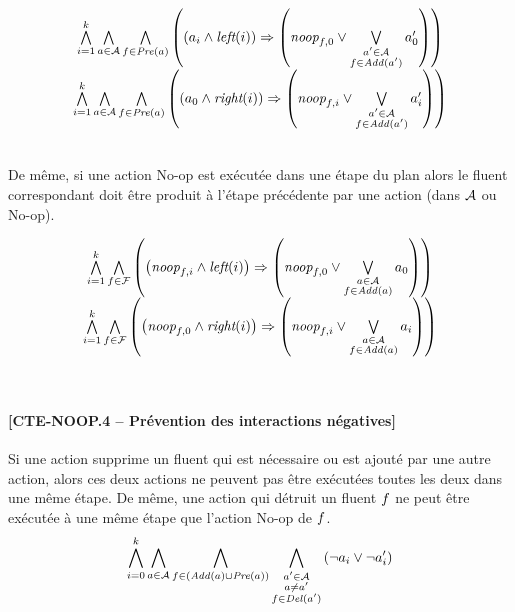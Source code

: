 \begin{small}
\[
\begin{matrix}
\bigwedge\limits_{\substack{i=1}}^{k} \bigwedge\limits_{\substack{a\in\mathcal{A}}} \bigwedge\limits_{\substack{f\in \mathit{Pre}(a)}} \left(\left(a_{i} \wedge \textit{left}(i) \right) \Rightarrow \left(\textit{noop}_{f,0} \vee \bigvee\limits_{\substack{a' \in \mathcal{A} \\ f \in \mathit{Add}(a')}} a'_{0}\right)\right)\\
\bigwedge\limits_{\substack{i=1}}^{k} \bigwedge\limits_{\substack{a\in\mathcal{A}}} \bigwedge\limits_{\substack{f\in \mathit{Pre}(a)}}\left(\left(a_{0} \wedge \textit{right}(i) \right) \Rightarrow \left(\textit{noop}_{f,i} \vee \bigvee\limits_{\substack{a' \in \mathcal{A} \\ f \in \mathit{Add}(a')}} a'_{i}\right)\right)
\end{matrix}
\]
\end{small}\\

De même, si une action No-op est exécutée dans une étape du plan alors le fluent correspondant doit être produit à l'étape précédente par une action (dans $\mathcal{A}$ ou No-op).

\begin{small}
\[
\begin{matrix}
\bigwedge\limits_{\substack{i=1}}^{k} \bigwedge\limits_{\substack{f\in \mathcal{F}}} \left(\left(\textit{noop}_{f,i} \wedge \textit{left}(i) \right) \Rightarrow \left(\textit{noop}_{f,0} \vee \bigvee\limits_{\substack{a \in \mathcal{A} \\ f \in \mathit{Add}(a)}} a_{0}\right)\right)\\
\bigwedge\limits_{\substack{i=1}}^{k}\bigwedge\limits_{\substack{f\in \mathcal{F}}}\left(\left(\textit{noop}_{f,0} \wedge \textit{right}(i) \right) \Rightarrow \left(\textit{noop}_{f,i} \vee \bigvee\limits_{\substack{a \in \mathcal{A} \\ f \in \mathit{Add}(a)}} a_{i}\right)\right)
\end{matrix}
\]
\end{small}\\

\paragraph*{[CTE-NOOP.4 -- Prévention des interactions négatives]}

Si une action supprime un fluent qui est nécessaire ou est ajouté par une autre action, alors ces deux actions ne peuvent pas être exécutées toutes les deux dans une même étape. De même, une action qui détruit un fluent $f$ ne peut être exécutée à une même étape que l'action No-op de $f$.
\[ \bigwedge\limits_{\substack{i=0}}^{k} \bigwedge\limits_{\substack{a \in \mathcal{A}}} \bigwedge\limits_{\substack{f\in \left(\mathit{Add}(a) \cup \mathit{Pre}(a)\right)}} \bigwedge\limits_{\substack{a' \in \mathcal{A} \\ a \neq a' \\ f \in \mathit{Del}(a')}}\left(\neg a_{i} \vee \neg a'_{i}\right) \]

